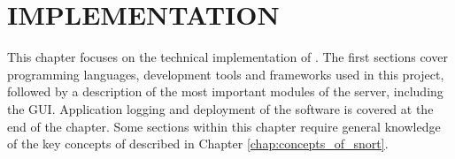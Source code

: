 \chapter{IMPLEMENTATION}
\label{chap:implementation}

This chapter focuses on the technical implementation of \snowman. The first
sections cover programming languages, development tools and frameworks used in
this project, followed by a description of the most important modules of the
server, including the GUI. Application logging and
deployment of the software is covered at the end of the chapter. Some sections
within this chapter require general knowledge of the key concepts of \snort{}
described in Chapter \ref{chap:concepts_of_snort}.
 











